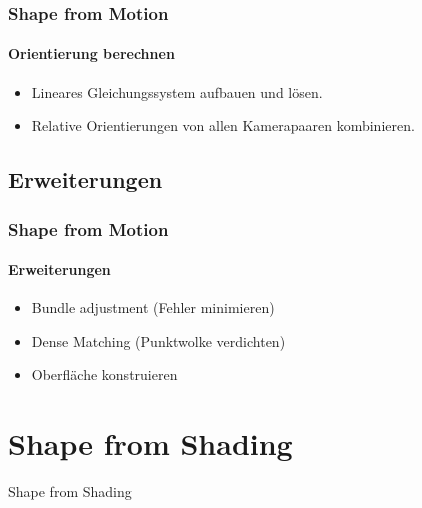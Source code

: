 \documentclass{beamer}
\begin{document}
\begin{frame}
	\frametitle{Shape from Motion}
	\framesubtitle{Orientierung berechnen}
	
	\begin{itemize}
		\item Lineares Gleichungssystem aufbauen und lösen.
		\item Relative Orientierungen von allen Kamerapaaren kombinieren.
	\end{itemize}
\end{frame}


\subsection{Erweiterungen}
\begin{frame}
	\frametitle{Shape from Motion}
	\framesubtitle{Erweiterungen}
	
	\begin{itemize}
		\item Bundle adjustment (Fehler minimieren)
		\item Dense Matching (Punktwolke verdichten)
		\item Oberfläche konstruieren
	\end{itemize}
\end{frame}


\section{Shape from Shading}

\begin{frame}	
	\center	\huge Shape from Shading
\end{frame}
\end{document}
